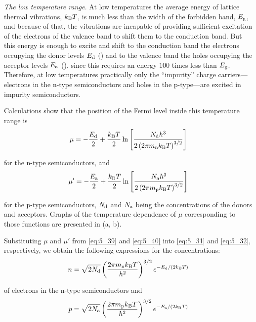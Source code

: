 \textit{The low temperature range.} At low temperatures the average energy of lattice thermal vibrations, $k_{\text{B}}T$, is much less than the width of the forbidden band, $E_{\text{g}}$, and because of that, the vibrations are incapable of providing sufficient excitation of the electrons of the valence band to shift them to the conduction band. But this energy is enough to excite and shift to the conduction band the electrons occupying the donor levels $E_{\text{d}}$ () and to the valence band the holes occupying the acceptor levels $E_{\text{a}}$ (), since this requires an energy $100$ times less than $E_{\text{g}}$. Therefore, at low temperatures practically only the ``impurity'' charge carriers—electrons in the n-type semiconductors and holes in the p-type---are excited in impurity semiconductors.

Calculations show that the position of the Fermi level inside this temperature range is
\begin{equation}\label{eq:5_39}
    \mu = -\frac{E_{\text{d}}}{2} + \frac{k_{\text{B}}T}{2} \ln\left[\frac{N_{\text{d}} h^3}{2 \left(2\pi m_{\text{n}} k_{\text{B}} T\right)^{3/2}}\right]
\end{equation}

\noindent
for the n-type semiconductors, and
\begin{equation}\label{eq:5_40}
    \mu' = -\frac{E_{\text{a}}}{2} + \frac{k_{\text{B}}T}{2} \ln\left[\frac{N_{\text{a}} h^3}{2 \left(2\pi m_{\text{p}} k_{\text{B}} T\right)^{3/2}}\right]
\end{equation}

\noindent
for the p-type semiconductors, $N_{\text{d}}$ and $N_{\text{a}}$ being the concentrations of the donors and acceptors. Graphs of the temperature dependence of $\mu$ corresponding to those functions are presented in (a, b).

Substituting $\mu$ and $\mu'$ from \eqref{eq:5_39} and \eqref{eq:5_40} into \eqref{eq:5_31} and \eqref{eq:5_32}, respectively, we obtain the following expressions for the concentrations:
\begin{equation}\label{eq:5_41}
    n = \sqrt{2N_{\text{d}}} \left(\frac{2\pi m_{\text{n}} k_{\text{B}} T}{h^2}\right)^{3/2} e^{-E_{\text{d}}/(2k_{\text{B}}T)}
\end{equation}

\noindent
of electrons in the n-type semiconductors and
\begin{equation}\label{eq:5_42}
    p = \sqrt{2N_{\text{a}}} \left(\frac{2\pi m_{\text{p}} k_{\text{B}} T}{h^2}\right)^{3/2} e^{-E_{\text{a}}/(2k_{\text{B}}T)}
\end{equation}

